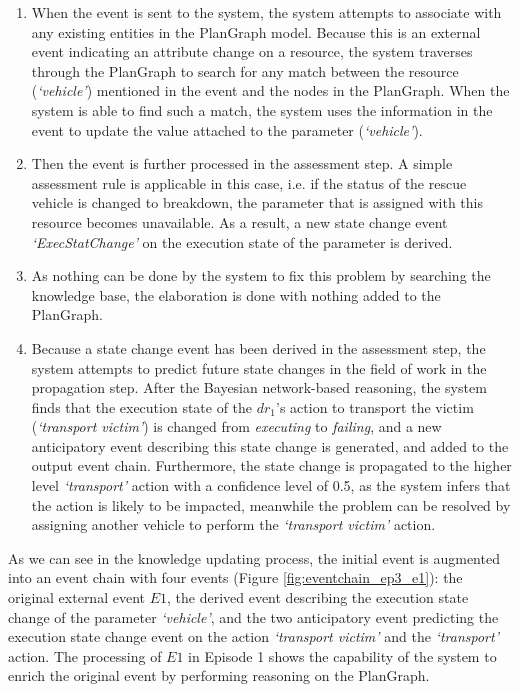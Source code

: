 \begin{enumerate}
	\item When the event is sent to the system, the system attempts to associate with any existing entities in the PlanGraph model. Because this is an external event indicating an attribute change on a resource, the system traverses through the PlanGraph to search for any match between the resource (\emph{`vehicle'}) mentioned in the event and the nodes in the PlanGraph. When the system is able to find such a match, the system uses the information in the event to update the value attached to the parameter (\emph{`vehicle'}).
	\item Then the event is further processed in the assessment step. A simple assessment rule is applicable in this case, i.e. if the status of the rescue vehicle is changed to breakdown, the parameter that is assigned with this resource becomes unavailable. As a result, a new state change event \emph{`ExecStatChange'} on the execution state of the parameter is derived.
	\item As nothing can be done by the system to fix this problem by searching the knowledge base, the elaboration is done with nothing added to the PlanGraph.
	\item Because a state change event has been derived in the assessment step, the system attempts to predict future state changes in the field of work in the propagation step. After the Bayesian network-based reasoning, the system finds that the execution state of the $dr_1$'s action to transport the victim (\emph{`transport victim'}) is changed from \emph{executing} to \emph{failing}, and a new anticipatory event describing this state change is generated, and added to the output event chain. Furthermore, the state change is propagated to the higher level \emph{`transport'} action with a confidence level of 0.5, as the system infers that the action is likely to be impacted, meanwhile the problem can be resolved by assigning another vehicle to perform the \emph{`transport victim'} action.
\end{enumerate}

As we can see in the knowledge updating process, the initial event is augmented into an event chain with four events (Figure \ref{fig:eventchain_ep3_e1}): the original external event $E1$, the derived event describing the execution state change of the parameter \emph{`vehicle'}, and the two anticipatory event predicting the execution state change event on the action \emph{`transport victim'} and the \emph{`transport'} action. The processing of $E1$ in Episode 1 shows the capability of the system to enrich the original event by performing reasoning on the PlanGraph.

